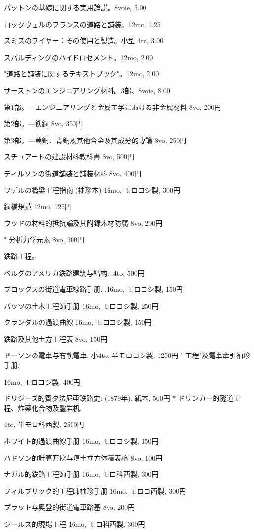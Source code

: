 \documentclass[a4paper,11pt,openany]{ltjsbook}
\begin{document}
パットンの基礎に関する実用論説。8voie, 5.00

ロックウェルのフランスの道路と舗装。12mo, 1.25

スミスのワイヤー：その使用と製造。小型 4to, 3.00

スパルディングのハイドロセメント。12mo, 2.00

"道路と舗装に関するテキストブック"。12mo, 2.00

サーストンのエンジニアリング材料。3部、8voie, 8.00

第1部。—エンジニアリングと金属工学における非金属材料 8vo, 200円

第2部。—鉄鋼 8vo, 350円

第3部。—黄銅、青銅及其他合金及其成分的専論 8vo, 250円

スチュアートの建設材料教科書 8vo, 500円

ティルソンの街道舗装と舗装材料 8vo, 400円

ワデルの橋梁工程指南 (袖珍本) 16mo, モロコシ製, 300円

鋼橋規范 12mo, 125円

ウッドの材料的抵抗論及其附録木材防腐 8vo, 200円

"        分析力学元素 8vo, 300円

鉄路工程。

ベルグのアメリカ鉄路建筑与結构. .4to, 500円

ブロックスの街道電車線路手册. .16mo, モロコシ製, 150円

バッツの土木工程師手册 16mo, モロコシ製, 250円

クランダルの過渡曲線 16mo, モロコシ製, 150円

鉄路及其他土方工程表 8vo, 150円

ドーソンの電車与有軌電車. 小4to, 半モロコシ製, 1250円 " 工程"及電車牽引袖珍手册.

16mo, モロコシ製, 400円

ドリジーズ的賓夕法尼亜鉄路史: (1879年). 紙本, 500円 * ドリンカー的隧道工程、炸薬化合物及鑿岩机.

4to, 半モロ科西製, 2500円

ホワイト的過渡曲線手册 16mo, モロコシ製, 150円

ハドソン的計算开挖与填土立方体積表格 8vo, 100円

ナガル的鉄路工程師手册 16mo, モロ科西製, 300円

フィルブリック的工程師袖珍手册 16mo, モロコ西製, 300円

プラット与奥登的街道電車路基 8vo, 200円

シールズ的現場工程 16mo, モロ科西製, 300円
\end{document}
